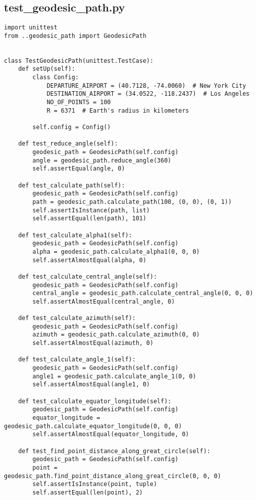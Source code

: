 \subsection{test_geodesic_path.py}
\begin{verbatim}
import unittest
from ..geodesic_path import GeodesicPath


class TestGeodesicPath(unittest.TestCase):
    def setUp(self):
        class Config:
            DEPARTURE_AIRPORT = (40.7128, -74.0060)  # New York City
            DESTINATION_AIRPORT = (34.0522, -118.2437)  # Los Angeles
            NO_OF_POINTS = 100
            R = 6371  # Earth's radius in kilometers

        self.config = Config()

    def test_reduce_angle(self):
        geodesic_path = GeodesicPath(self.config)
        angle = geodesic_path.reduce_angle(360)
        self.assertEqual(angle, 0)

    def test_calculate_path(self):
        geodesic_path = GeodesicPath(self.config)
        path = geodesic_path.calculate_path(100, (0, 0), (0, 1))
        self.assertIsInstance(path, list)
        self.assertEqual(len(path), 101)

    def test_calculate_alpha1(self):
        geodesic_path = GeodesicPath(self.config)
        alpha = geodesic_path.calculate_alpha1(0, 0, 0)
        self.assertAlmostEqual(alpha, 0)

    def test_calculate_central_angle(self):
        geodesic_path = GeodesicPath(self.config)
        central_angle = geodesic_path.calculate_central_angle(0, 0, 0)
        self.assertAlmostEqual(central_angle, 0)

    def test_calculate_azimuth(self):
        geodesic_path = GeodesicPath(self.config)
        azimuth = geodesic_path.calculate_azimuth(0, 0)
        self.assertAlmostEqual(azimuth, 0)

    def test_calculate_angle_1(self):
        geodesic_path = GeodesicPath(self.config)
        angle1 = geodesic_path.calculate_angle_1(0, 0)
        self.assertAlmostEqual(angle1, 0)

    def test_calculate_equator_longitude(self):
        geodesic_path = GeodesicPath(self.config)
        equator_longitude = geodesic_path.calculate_equator_longitude(0, 0, 0)
        self.assertAlmostEqual(equator_longitude, 0)

    def test_find_point_distance_along_great_circle(self):
        geodesic_path = GeodesicPath(self.config)
        point = geodesic_path.find_point_distance_along_great_circle(0, 0, 0)
        self.assertIsInstance(point, tuple)
        self.assertEqual(len(point), 2)

\end{verbatim}
